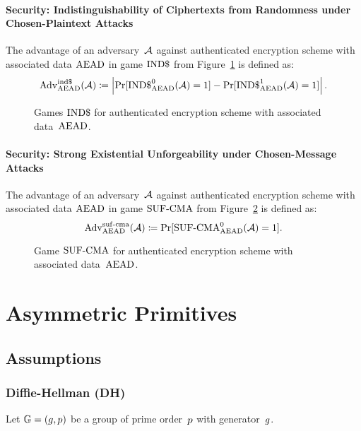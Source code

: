 \documentclass[a4paper,orivec]{llncs}
\begin{document}
\paragraph{Security: Indistinguishability of Ciphertexts from Randomness under Chosen-Plaintext Attacks}
The advantage of an adversary~$\mathcal{A}$ against authenticated encryption scheme with associated data $\mathrm{AEAD}$ in game ${\mathrm{IND}\$}$ from Figure~\ref{fig:sym:aenc:indd} is defined as:
\[
\mathrm{Adv}_{\mathrm{AEAD}}^{\mathrm{ind}\$}(\mathcal{A})\coloneqq\left|\Pr[{\mathrm{IND}\$}_{\mathrm{AEAD}}^0(\mathcal{A})=1]-\Pr[{\mathrm{IND}\$}_{\mathrm{AEAD}}^1(\mathcal{A})=1]\right|\text{.}
\]

\begin{figure}[!ht]
    \centering
    \nicoresetlinenr%
    \fbox{%
        \scalebox{\codescalefactor}{%
        }%
    }
    \caption{%
        Games ${\mathrm{IND}\$}$ for authenticated encryption scheme with associated data~$\mathrm{AEAD}$.
    }
    \label{fig:sym:aenc:indd}
\end{figure}

\paragraph{Security: Strong Existential Unforgeability under Chosen-Message Attacks}
The advantage of an adversary~$\mathcal{A}$ against authenticated encryption scheme with associated data $\mathrm{AEAD}$ in game ${\mathrm{SUF}\text{-}\mathrm{CMA}}$ from Figure~\ref{fig:sym:aenc:suf} is defined as:
\[
\mathrm{Adv}_{\mathrm{AEAD}}^{\mathrm{suf}\text{-}\mathrm{cma}}(\mathcal{A})\coloneqq\Pr[{\mathrm{SUF}\text{-}\mathrm{CMA}}_{\mathrm{AEAD}}^0(\mathcal{A})=1]\text{.}
\]

\begin{figure}[!ht]
    \centering
    \nicoresetlinenr%
    \fbox{%
        \scalebox{\codescalefactor}{%
        }%
    }
    \caption{%
        Game ${\mathrm{SUF}\text{-}\mathrm{CMA}}$ for authenticated encryption scheme with associated data~$\mathrm{AEAD}$.
    }
    \label{fig:sym:aenc:suf}
\end{figure}




\section{Asymmetric Primitives}
\label{sec:asym}

\subsection{Assumptions}
\label{sec:asym:assumptions}

\subsubsection{Diffie-Hellman (DH)}
\label{sec:asym:assumptions:dh}
Let $\mathbb{G}=(g,p)$ be a group of prime order~$p$ with generator~$g$.
\end{document}
